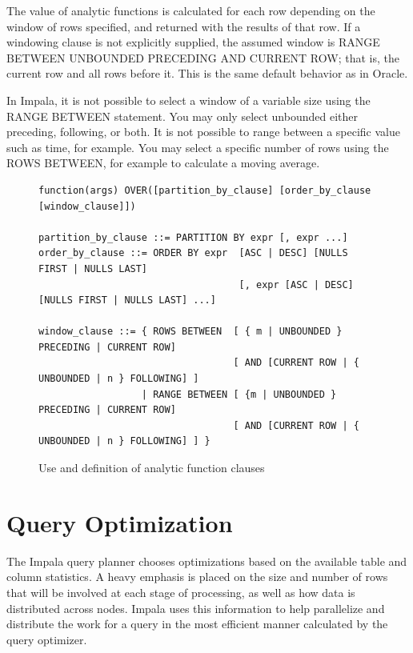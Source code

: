 \documentclass[onecolumn, draftclsnofoot,10pt, compsoc]{IEEEtran}
\begin{document}
The value of analytic functions is calculated for each row depending on the window of rows specified, and returned with the results of that row.
If a windowing clause is not explicitly supplied, the assumed window is RANGE BETWEEN UNBOUNDED PRECEDING AND CURRENT ROW; that is, the current row and all rows before it.
This is the same default behavior as in Oracle. 

In Impala, it is not possible to select a window of a variable size using the RANGE BETWEEN statement. 
You may only select unbounded either preceding, following, or both. 
It is not possible to range between a specific value such as time, for example. 
You may select a specific number of rows using the ROWS BETWEEN, for example to calculate a moving average.

\begin{figure}[ht]
    \begin{center}
    \begin{lstlisting}
function(args) OVER([partition_by_clause] [order_by_clause [window_clause]])

partition_by_clause ::= PARTITION BY expr [, expr ...]
order_by_clause ::= ORDER BY expr  [ASC | DESC] [NULLS FIRST | NULLS LAST] 
                                   [, expr [ASC | DESC] [NULLS FIRST | NULLS LAST] ...]

window_clause ::= { ROWS BETWEEN  [ { m | UNBOUNDED } PRECEDING | CURRENT ROW] 
                                  [ AND [CURRENT ROW | { UNBOUNDED | n } FOLLOWING] ]
                  | RANGE BETWEEN [ {m | UNBOUNDED } PRECEDING | CURRENT ROW] 
                                  [ AND [CURRENT ROW | { UNBOUNDED | n } FOLLOWING] ] }
\end{lstlisting}
    \caption{Use and definition of analytic function clauses}
    \end{center}
\end{figure}
    
\section{Query Optimization}
The Impala query planner chooses optimizations based on the available table and column statistics.
A heavy emphasis is placed on the size and number of rows that will be involved at each stage of processing, as well as how data is distributed across nodes.
Impala uses this information to help parallelize and distribute the work for a query in the most efficient manner calculated by the query optimizer.
\end{document}
